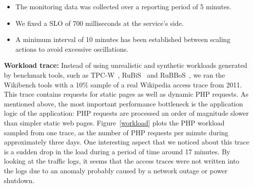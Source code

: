 \begin{itemize}

\item The monitoring data was collected over a reporting period of 5 minutes.

\item We fixed a SLO of 700 milliseconds at the service's side.



\item A minimum interval of 10 minutes has been established between scaling actions to avoid excessive oscillations. 
\end{itemize}




\textbf{Workload trace:}  Instead of using unrealistic and synthetic workloads generated by benchmark tools, such as TPC-W~\cite{TPC-W}, RuBiS~\cite{} and RuBBoS~\cite{}, we ran the Wikibench tools with a 10\% sample of a real Wikipedia access trace from 2011.  This trace contains requests for static pages as well as dynamic PHP requests. As mentioned above, the most important performance bottleneck is the application logic of the application: PHP requests are processed an order of magnitude slower than simpler static web pages. Figure~\ref{workload} plots the PHP workload sampled from one trace, as the number of PHP requests per minute during approximately three days. One interesting aspect that we noticed about this trace is a sudden drop in the load during a period of time around 17 minutes. By looking at the traffic logs, it seems that the access traces were not written into the logs due to an anomaly probably caused by a network outage or power shutdown. 

